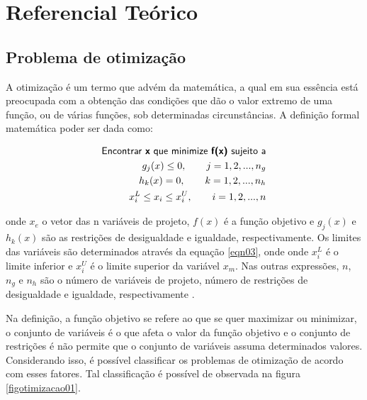 
\chapter[Referencial Teórico]{Referencial Teórico}
\label{referencialteorico}

\section{Problema de otimização}

A otimização é um termo que advém da matemática, a qual em sua essência está preocupada com a obtenção das condições que dão o valor extremo de uma função, ou de várias funções, sob determinadas circunstâncias. A definição formal matemática poder ser dada como: 

\begin{eqnarray}
\label{eqn01}
	 \textsf{Encontrar \textbf{x} que minimize \textbf{f(x)} sujeito a} \nonumber \\
     g_j(x) \leq 0, \qquad j = 1, 2, ..., n_g \\
\label{eqn02}
      h_k(x) = 0, \qquad k = 1, 2, ..., n_h \\
\label{eqn03}
      x_{i}^{L} \leq x_i \leq x_{i}^{U}, \qquad i = 1, 2, ..., n 
\end{eqnarray}

onde $x_{e}$ o vetor das n variáveis de projeto, $f(x)$ é a função objetivo e $g_{j}(x)$ e $h_{k}(x)$ são as restrições de desigualdade e igualdade, respectivamente. Os limites das variáveis são determinados através da equação \ref{eqn03}, onde onde $x_{i}^{L}$ é o limite inferior e $x_{i}^{U}$ é o limite superior da variável $x_{m}$. Nas outras expressões, $n$, $n_{g}$ e $n_{h}$ são o número de variáveis de projeto, número de restrições de desigualdade e igualdade, respectivamente \cite{gandomi2013metaheuristic}.

Na definição, a função objetivo se refere ao que se quer maximizar ou minimizar, o conjunto de variáveis é o que afeta o valor da função objetivo e o conjunto de restrições é não permite que o conjunto de variáveis assuma
determinados valores. Considerando isso, é possível classificar os problemas de otimização de acordo com esses fatores. Tal classificação é possível de observada na figura \ref{figotimizacao01}.

